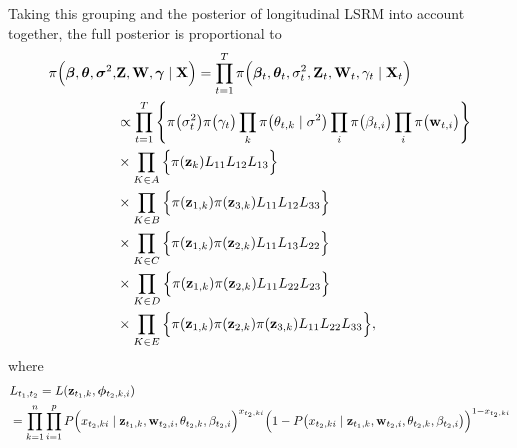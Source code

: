 \documentclass[a4paper, 11pt]{report}
\begin{document}
\quad Taking this grouping and the posterior of longitudinal LSRM into account together, the full posterior is proportional to
\begin{equation}
\label{full.posterior}
\begin{split}
\pi\Big(\boldsymbol\beta, \boldsymbol\theta, \boldsymbol\sigma^2, &{\bf Z}, {\bf W}, \boldsymbol\gamma \mid {\bf X}\Big) = \prod_{t=1}^T \pi\Big(\boldsymbol\beta_t, \boldsymbol\theta_t, \sigma_t^2, {\bf Z}_t, {\bf W}_t, \gamma_t \mid {\bf X}_t\Big)\\ 
&\propto \prod_{t=1}^T \Bigg\{\pi\big(\sigma_t^2\big) \pi\big(\gamma_t\big) \prod_{k}\pi\big(\theta_{t,k} \mid \sigma^2\big) \prod_{i}\pi\big(\beta_{t,i}\big)
\prod_{i}\pi\big({\bf w}_{t,i}\big) \Bigg\}\\
&\times \prod_{K\in A}\Big \{\pi({\bf z}_{k}) L_{11} L_{12} L_{13} \Big \}\\
&\times \prod_{K\in B}\Big \{\pi({\bf z}_{1,k}) \pi({\bf z}_{3,k}) L_{11} L_{12} L_{33}\Big \}\\
&\times \prod_{K\in C}\Big \{\pi({\bf z}_{1,k}) \pi({\bf z}_{2,k}) L_{11} L_{13} L_{22} \Big \}\\
&\times \prod_{K\in D}\Big \{\pi({\bf z}_{1,k}) \pi({\bf z}_{2,k}) L_{11} L_{22} L_{23} \Big \}\\
&\times \prod_{K\in E}\Big \{\pi({\bf z}_{1,k}) \pi({\bf z}_{2,k}) \pi({\bf z}_{3,k}) L_{11} L_{22} L_{33} \Big \},
\end{split}
\end{equation}
where
\begin{equation}\notag
\begin{split}
&L_{t_1,t_2} = L({\bf z}_{t_1,k}, {\boldsymbol \phi}_{t_2,k,i})\\
&= \prod_{k=1}^n\prod_{i=1}^p P\Big(x_{t_2,ki} \mid {\bf z}_{t_1,k}, {\bf w}_{t_2,i}, \theta_{t_2,k}, \beta_{t_2,i}\Big)^{x_{t_2,ki}}
\Big(1-P\big(x_{t_2,ki} \mid {\bf z}_{t_1,k}, {\bf w}_{t_2,i}, \theta_{t_2,k}, \beta_{t_2,i}\big)\Big)^{1-x_{t_2,ki}}
\end{split}
\end{equation}
\end{document}
